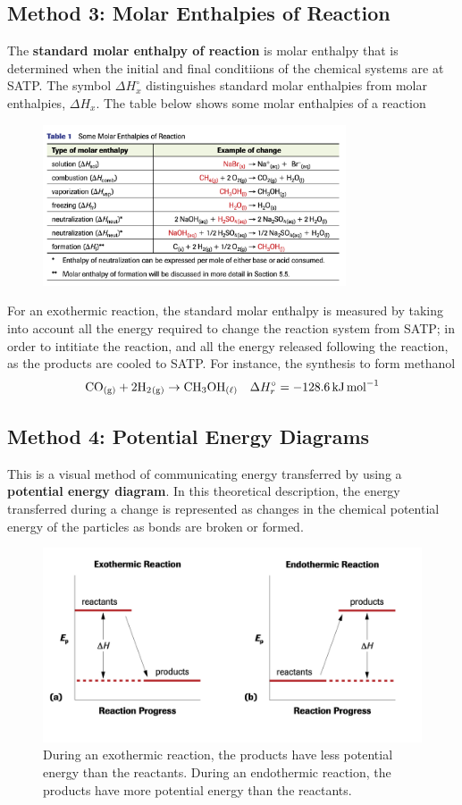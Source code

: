 \subsection{Method 3: Molar Enthalpies of Reaction}
The \textbf{standard molar enthalpy of reaction} is molar enthalpy that is determined when the
initial and final conditiions of the chemical systems are at SATP. The symbol $\Delta H^\circ_x$
distinguishes standard molar enthalpies from molar enthalpies, $\Delta H_x$. The table below
shows some molar enthalpies of a reaction
\begin{figure}[ht!]
    \centering
    \includegraphics[width=0.8\textwidth]{../figures/molar-enthalpies-of-reaction.png}
\end{figure}
For an exothermic reaction, the standard molar enthalpy is measured by taking into account all
the energy required to change the reaction system from SATP; in order to intitiate the reaction,
and all the energy released following the reaction, as the products are cooled to SATP. For
instance, the synthesis to form methanol
\[
    \ch{CO_{(g)}}+2 \ch{H2_{(g)}}\to \ch{CH3OH_{(\ell)}}\quad\Delta H^\circ_r=-128.6\,\si{kJ.mol^{-1}}
\]

\subsection{Method 4: Potential Energy Diagrams}
This is a visual method of communicating energy transferred by using a \textbf{potential energy
diagram}. In this theoretical description, the energy transferred during a change is represented
as changes in the chemical potential energy of the particles as bonds are broken or formed.\\

\begin{figure}[ht!]
    \centering
    \includegraphics[width=0.8 \textwidth]{../figures/potential-energy-diagrams-1.png}
    \caption{During an exothermic reaction, the products have less potential energy than the
        reactants. During an endothermic reaction, the products have more potential energy than
        the reactants.}
\end{figure}

